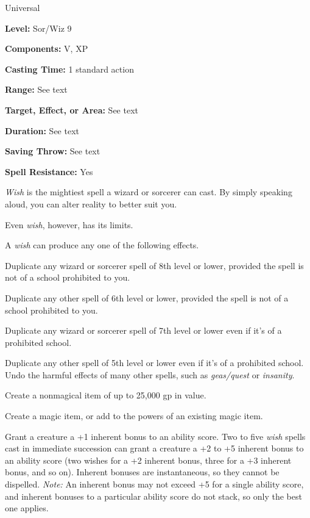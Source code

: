 
Universal

\textbf{Level:} Sor/Wiz 9

\textbf{Components:} V, XP

\textbf{Casting Time:} 1 standard action

\textbf{Range:} See text

\textbf{Target, Effect, or Area:} See text

\textbf{Duration:} See text

\textbf{Saving Throw:} See text

\textbf{Spell Resistance:} Yes

\textit{Wish} is the mightiest spell a wizard or sorcerer can cast. By simply speaking 
aloud, you can alter reality to better suit you.

Even \textit{wish}, however, has its limits.

A \textit{wish} can produce any one of the following effects.%

Duplicate any wizard or sorcerer spell of 8th level or lower, provided the spell 
is not of a school prohibited to you.%

Duplicate any other spell of 6th level or lower, provided the spell is not of a 
school prohibited to you.%

Duplicate any wizard or sorcerer spell of 7th level or lower even if it's of a 
prohibited school.%

Duplicate any other spell of 5th level or lower even if it's of a prohibited school. 
Undo the harmful effects of many other spells, such as \textit{geas/quest} or \textit{insanity}.%

Create a nonmagical item of up to 25,000 gp in value.%

Create a magic item, or add to the powers of an existing magic item.%

Grant a creature a +1 inherent bonus to an ability score. Two to five \textit{wish 
}spells cast in immediate succession can grant a creature a +2 to +5 inherent bonus 
to an ability score (two wishes for a +2 inherent bonus, three for a +3 inherent 
bonus, and so on). Inherent bonuses are instantaneous, so they cannot be dispelled. 
\textit{Note:} An inherent bonus may not exceed +5 for a single ability score, 
and inherent bonuses to a particular ability score do not stack, so only the best 
one applies.%

